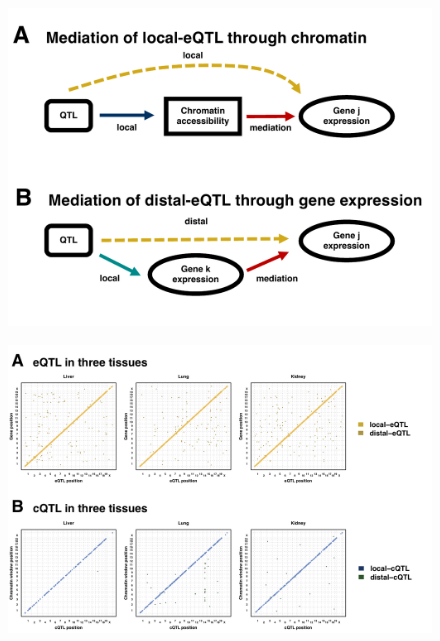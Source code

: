 \documentclass[10pt,letterpaper]{article}
\begin{document}
\newpage

\begin{figure}[hp]
\includegraphics[width=\linewidth, clip, trim={0in 0.5in 0in 0in}]{figs/mediation_graph.pdf}
\caption{}
\end{figure}

\newpage

\begin{figure}[hp]
\includegraphics[width=\textwidth, trim={0in 0in 0in 0in}, clip]{figs/qtl_map_main.png}
\caption{}
\end{figure}

\newpage
\end{document}
